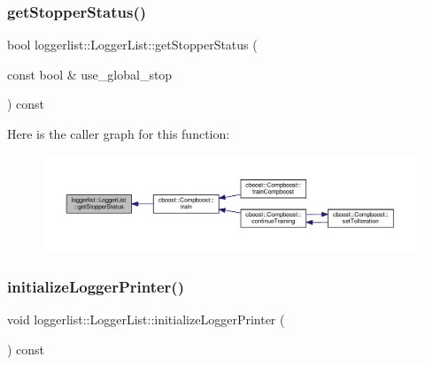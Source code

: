 \mbox{\label{classloggerlist_1_1_logger_list_ad11e128af600ad8e68df3c702ef11792}} 
\subsubsection{\texorpdfstring{get\+Stopper\+Status()}{getStopperStatus()}}
{\footnotesize\ttfamily bool loggerlist\+::\+Logger\+List\+::get\+Stopper\+Status (\begin{DoxyParamCaption}\item[{const bool \&}]{use\+\_\+global\+\_\+stop }\end{DoxyParamCaption}) const}

Here is the caller graph for this function\+:\nopagebreak
\begin{figure}[H]
\begin{center}
\leavevmode
\includegraphics[width=350pt]{classloggerlist_1_1_logger_list_ad11e128af600ad8e68df3c702ef11792_icgraph}
\end{center}
\end{figure}
\mbox{\label{classloggerlist_1_1_logger_list_a07c6748f551b89aa0b1eede48b120728}} 
\subsubsection{\texorpdfstring{initialize\+Logger\+Printer()}{initializeLoggerPrinter()}}
{\footnotesize\ttfamily void loggerlist\+::\+Logger\+List\+::initialize\+Logger\+Printer (\begin{DoxyParamCaption}{ }\end{DoxyParamCaption}) const}

